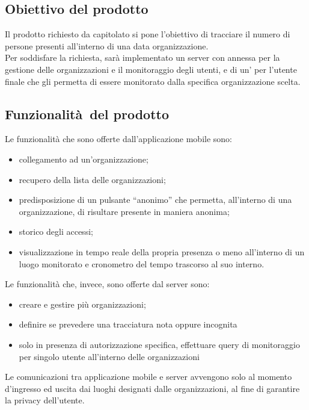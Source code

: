 \documentclass[../analisi-dei-requisiti]{subfiles}
\begin{document}
\subsection{Obiettivo del prodotto}%
\label{sub:obiettivo_del_prodotto}
Il prodotto richiesto da capitolato si pone l'obiettivo di tracciare il numero di persone presenti all’interno di una data organizzazione.\\
Per soddisfare la richiesta, sarà implementato un server con annessa  per la gestione delle organizzazioni e il monitoraggio degli utenti, e
di un' per l'utente finale che gli permetta di essere monitorato dalla specifica organizzazione scelta.

\subsection{Funzionalità del prodotto}%
\label{sub:funzionalita_del_prodotto}
Le funzionalità che sono offerte dall'applicazione mobile sono:
\begin{itemize}
  \item collegamento ad un’organizzazione;
  \item recupero della lista delle organizzazioni;
  \item predisposizione di un pulsante “anonimo” che permetta, all’interno di una organizzazione, di risultare presente in maniera anonima;
  \item storico degli accessi;
  \item visualizzazione in tempo reale della propria presenza o meno all’interno di un luogo monitorato e cronometro del tempo trascorso al suo interno.
\end{itemize}

Le funzionalità che, invece, sono offerte dal server sono:
\begin{itemize}
  \item creare e gestire più organizzazioni;
  \item definire se prevedere una tracciatura nota oppure incognita
  \item solo in presenza di autorizzazione specifica, effettuare query di monitoraggio per singolo utente all’interno delle organizzazioni
\end{itemize}
Le comunicazioni tra applicazione mobile e server avvengono solo al momento d'ingresso ed uscita dai luoghi designati dalle organizzazioni, al fine di garantire
la privacy dell'utente.
\end{document}
